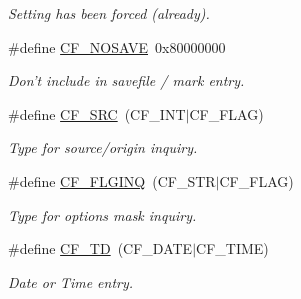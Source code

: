 \begin{CompactItemize}
\begin{CompactList}\small\item\em Setting has been forced (already). \item\end{CompactList}\item 
\hypertarget{group__special__options__mask_gd76153c65f68cc0ee5c1a04c8c3e80bf}{
\#define \hyperlink{group__special__options__mask_gd76153c65f68cc0ee5c1a04c8c3e80bf}{CF\_\-NOSAVE}~0x80000000}
\label{group__special__options__mask_gd76153c65f68cc0ee5c1a04c8c3e80bf}

\begin{CompactList}\small\item\em Don't include in savefile / mark entry. \item\end{CompactList}\item 
\hypertarget{group__special__options__mask_gd9b1f659b11c529a0ed1035caf8b239b}{
\#define \hyperlink{group__special__options__mask_gd9b1f659b11c529a0ed1035caf8b239b}{CF\_\-SRC}~(CF\_\-INT$|$CF\_\-FLAG)}
\label{group__special__options__mask_gd9b1f659b11c529a0ed1035caf8b239b}

\begin{CompactList}\small\item\em Type for source/origin inquiry. \item\end{CompactList}\item 
\hypertarget{group__special__options__mask_g36792935eec7c6636b6aea8df82f7480}{
\#define \hyperlink{group__special__options__mask_g36792935eec7c6636b6aea8df82f7480}{CF\_\-FLGINQ}~(CF\_\-STR$|$CF\_\-FLAG)}
\label{group__special__options__mask_g36792935eec7c6636b6aea8df82f7480}

\begin{CompactList}\small\item\em Type for options mask inquiry. \item\end{CompactList}\item 
\hypertarget{group__special__options__mask_g8a50d7326b057d262f53ef84a166f9c5}{
\#define \hyperlink{group__special__options__mask_g8a50d7326b057d262f53ef84a166f9c5}{CF\_\-TD}~(CF\_\-DATE$|$CF\_\-TIME)}
\label{group__special__options__mask_g8a50d7326b057d262f53ef84a166f9c5}

\begin{CompactList}\small\item\em Date or Time entry. \item\end{CompactList}\end{CompactItemize}
